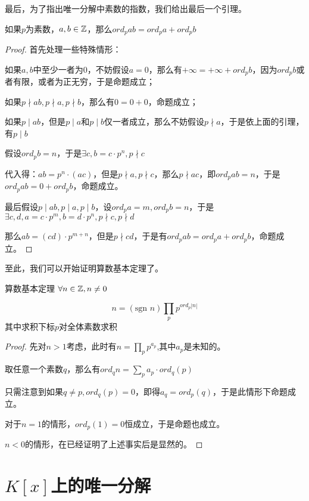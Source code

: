 \documentclass[12pt, a4paper, oneside, UTF8]{ctexbook}
\begin{document}
			最后，为了指出唯一分解中素数的指数，我们给出最后一个引理。
			\begin{lemma}{}{}
				如果$p$为素数，$a,b\in \mathbb{Z}$，那么$ord_p ab=ord_p a + ord_p b$
			\end{lemma}
			\begin{proof}
				首先处理一些特殊情形：
				
				如果$a,b$中至少一者为$0$，不妨假设$a=0$，那么有$+\infty = +\infty + ord_p b$，因为$ord_p b$或者有限，或者为正无穷，于是命题成立；
				
				如果$p \nmid ab,p\nmid a,p\nmid b$，那么有$0=0+0$，命题成立；
				
				如果$p \mid ab$，但是$p \mid a$和$p \mid b$仅一者成立，那么不妨假设$p \nmid a$，于是依上面的引理，有$p \mid b$
				
				假设$ord_p b = n$，于是$\exists c,b=c\cdot p^n,p \nmid c$
				
				代入得：$ab=p^n\cdot (ac)$，但是$p \nmid a,p\nmid c$，那么$p \nmid ac$，即$ord_p ab=n$，于是$ord_p ab = 0+ ord_p b$，命题成立。
				
				最后假设$p \mid ab,p \mid a,p \mid b$，设$ord_p a = m,ord_p b = n$，于是$\exists c,d,a = c\cdot p^m,b=d\cdot p^n,p \nmid c,p\nmid d$
				
				那么$ab=(cd)\cdot p^{m+n}$，但是$p \nmid cd$，于是有$ord_p ab=ord_p a + ord_p b$，命题成立。
			\end{proof}
			至此，我们可以开始证明算数基本定理了。
			\begin{them}{算数基本定理}{}
				$\forall n \in \mathbb{Z},n \neq 0$
				
				\begin{equation}
					n = (\text{sgn } n) \prod_{p} p^{ord_p |n|}
				\end{equation}
				其中求积下标$p$对全体素数求积
			\end{them}
			\begin{proof}
				先对$n > 1$考虑，此时有$n=\prod_{p} p^{a_p}$,其中$a_p$是未知的。
				
				取任意一个素数$q$，那么有$ord_q n=\sum\limits_{p} a_p\cdot ord_q (p)$
				
				只需注意到如果$q \neq p,ord_q (p)=0$，即得$a_q = ord_p (q)$，于是此情形下命题成立。
				
				对于$n=1$的情形，$ord_p (1)=0$恒成立，于是命题也成立。
				
				$n <0$的情形，在已经证明了上述事实后是显然的。 
			\end{proof}
	\section{$K[x]$上的唯一分解}
\end{document}
